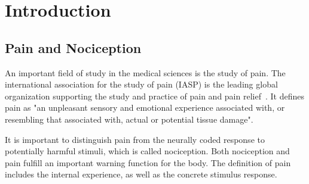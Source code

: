 \chapter{Introduction}
\begin{comment}
In this chapter I will give an introduction to the topic. I will give background information about neuropathic pain and the big picture goal of research in this field. \\
-quickly explain how the transmission of pain functions inside our bodies\\
-what is my bachelor thesis based on (paper from Roberto)\\
-contextualize thesis topic within the big picture \\
-talk quickly about openMNGlab and goal of adding analysis functionality and discuss software engineering goals for the framework\\

nociception/pain\\
neuropathic pain -> constant firing\\
measuring data -> microneurography\\
analyzing data -> openMNGlab\\
results -> ideas for problemsolving

C fibers
when these fibers fire all the time this is called neuropathic pain
\end{comment}
\section{Pain and Nociception}
An important field of study in the medical sciences is the study of pain. The international association for the study of pain (IASP) is the leading global organization supporting the study and practice of pain and pain relief~\cite{iasp_2022}. It defines pain as "an unpleasant sensory and emotional experience associated with, or resembling that associated with, actual or potential tissue damage".

It is important to distinguish pain from the neurally coded response to potentially harmful stimuli, which is called nociception. Both nociception and pain fulfill an important warning function for the body. The definition of pain includes the internal experience, as well as the concrete stimulus response.

